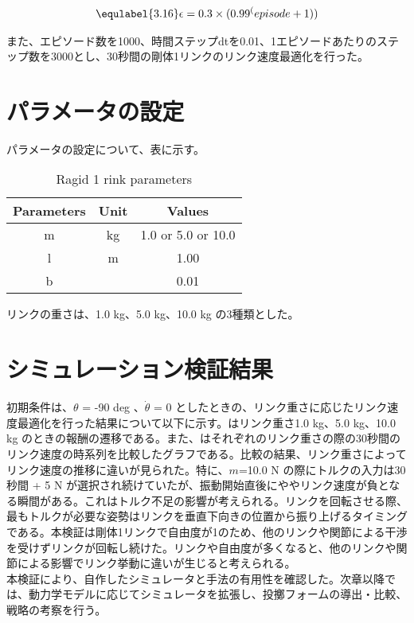 \begin{eqnarray}
  \equlabel{3.16}
  \epsilon = 0.3 \times ({0.99}^(episode + 1))
\end{eqnarray}

また、エピソード数を1000、時間ステップdtを0.01、1エピソードあたりのステップ数を3000とし、30秒間の剛体1リンクのリンク速度最適化を行った。
\section{パラメータの設定}
パラメータの設定について、表に示す。
\begin{table}[tb]
  \begin{center}
    \caption{Ragid 1 rink parameters}
    \begin{tabular}{c|c|c}
      \hline
      Parameters & Unit & Values \\
      \hline
      m & kg & 1.0 or 5.0 or 10.0\\
      l & m & 1.00 \\
      b &  & 0.01 \\
      \hline
    \end{tabular}
  \end{center}
\end{table}
リンクの重さは、1.0 kg、5.0 kg、10.0 kg の3種類とした。
\section{シミュレーション検証結果}
初期条件は、$\theta$ = -90 deg 、$\dot{\theta}$ = 0 としたときの、リンク重さに応じたリンク速度最適化を行った結果について以下に示す。はリンク重さ1.0 kg、5.0 kg、10.0 kg のときの報酬の遷移である。また、はそれぞれのリンク重さの際の30秒間のリンク速度の時系列を比較したグラフである。比較の結果、リンク重さによってリンク速度の推移に違いが見られた。特に、$m$=10.0 N の際にトルクの入力は30秒間 + 5 N が選択され続けていたが、振動開始直後にややリンク速度が負となる瞬間がある。これはトルク不足の影響が考えられる。リンクを回転させる際、最もトルクが必要な姿勢はリンクを垂直下向きの位置から振り上げるタイミングである。本検証は剛体1リンクで自由度が1のため、他のリンクや関節による干渉を受けずリンクが回転し続けた。リンクや自由度が多くなると、他のリンクや関節による影響でリンク挙動に違いが生じると考えられる。\\
本検証により、自作したシミュレータと手法の有用性を確認した。次章以降では、動力学モデルに応じてシミュレータを拡張し、投擲フォームの導出・比較、戦略の考察を行う。

